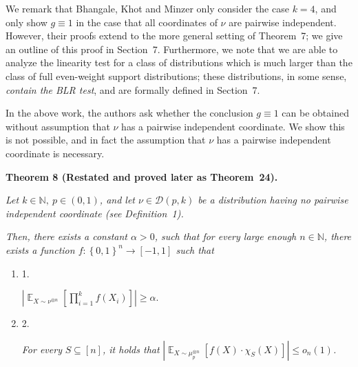 We remark that Bhangale, Khot and Minzer only consider the case $k=4$, and only show $g\equiv 1$ in the case that all coordinates of $\nu$ are pairwise independent.
However, their proofs extend to the more general setting of Theorem 7; we give an outline of this proof in Section 7.
Furthermore, we note that we are able to analyze the linearity test for a class of distributions which is much larger than the class of full even-weight support distributions; these distributions, in some sense, \emph{contain the BLR test}, and are formally defined in Section 7.\par




In the above work, the authors ask whether the conclusion $g\equiv 1$ can be obtained without assumption that $\nu$ has a pairwise independent coordinate.
We show this is not possible, and in fact the assumption that $\nu$ has a pairwise independent coordinate is necessary.\par





\par\medskip\noindent\textbf{
\textbf{Theorem 8}\textbf{ }(Restated and proved later as Theorem 24)\textbf{.}
}\par



\emph{Let $k\in\mathbb{N},\ p\in(0,1)$, and let $\nu\in\mathcal{D}(p,k)$ be a distribution having no pairwise independent coordinate (see Definition 1).}\par




\emph{Then, there exists a constant $\alpha>0$, such that for every large enough $n\in\mathbb{N}$, there exists a function $f:\left\{0,1\right\}^{n}\to[-1,1]$ such that}\par


\begin{enumerate}


\item[] 
1. 


$\left|\mathop{\mathbb{E}}_{X\sim\nu^{\otimes n}}\left[\prod_{i=1}^{k}f(X_{i})\right]\right|\geqslant\alpha.$\emph{}\par





\item[] 
2. 


\emph{For every }$S\subseteq[n]$\emph{, it holds that }$\left|\mathop{\mathbb{E}}_{X\sim\mu_{p}^{\otimes n}}\left[f(X)\cdot\chi_{S}(X)\right]\right|\leqslant o_{n}(1)$\emph{.}\par





\end{enumerate}




